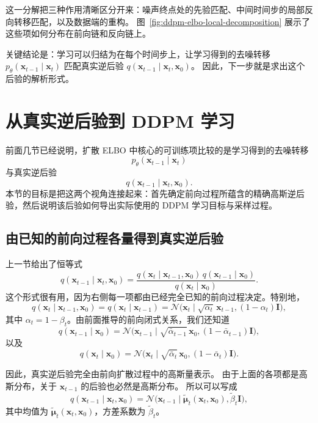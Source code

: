 这一分解把三种作用清晰区分开来：噪声终点处的先验匹配、中间时间步的局部反向转移匹配，以及数据端的重构。
图~\ref{fig:ddpm-elbo-local-decomposition} 展示了这些项如何分布在前向链和反向链上。



\noindent
关键结论是：学习可以归结为在每个时间步上，让学习得到的去噪转移
$p_\theta(\mathbf{x}_{t-1}\mid \mathbf{x}_t)$
匹配真实逆后验
$q(\mathbf{x}_{t-1}\mid \mathbf{x}_t,\mathbf{x}_0)$。
因此，下一步就是求出这个后验的解析形式。

\section{从真实逆后验到 DDPM 学习}

前面几节已经说明，扩散 ELBO 中核心的可训练项比较的是学习得到的去噪转移
\[
p_\theta(\mathbf{x}_{t-1}\mid \mathbf{x}_t)
\]
与真实逆后验
\[
q(\mathbf{x}_{t-1}\mid \mathbf{x}_t,\mathbf{x}_0).
\]
本节的目标是把这两个视角连接起来：首先确定前向过程所蕴含的精确高斯逆后验，然后说明该后验如何导出实际使用的 DDPM 学习目标与采样过程。

\subsection{由已知的前向过程各量得到真实逆后验}

上一节给出了恒等式
\[
q(\mathbf{x}_{t-1}\mid \mathbf{x}_t,\mathbf{x}_0)
=
\frac{
q(\mathbf{x}_t\mid \mathbf{x}_{t-1},\mathbf{x}_0)\,
q(\mathbf{x}_{t-1}\mid \mathbf{x}_0)
}{
q(\mathbf{x}_t\mid \mathbf{x}_0)
}.
\]
这个形式很有用，因为右侧每一项都由已经完全已知的前向过程决定。特别地，
\[
q(\mathbf{x}_t\mid \mathbf{x}_{t-1},\mathbf{x}_0)
=
q(\mathbf{x}_t\mid \mathbf{x}_{t-1})
=
\mathcal{N}\!\bigl(
\mathbf{x}_t \mid
\sqrt{\alpha_t}\,\mathbf{x}_{t-1},
(1-\alpha_t)\mathbf{I}
\bigr),
\]
其中 $\alpha_t=1-\beta_t$。由前面推导的前向闭式关系，我们还知道
\[
q(\mathbf{x}_{t-1}\mid \mathbf{x}_0)
=
\mathcal{N}\!\bigl(
\mathbf{x}_{t-1}\mid
\sqrt{\bar{\alpha}_{t-1}}\,\mathbf{x}_0,
(1-\bar{\alpha}_{t-1})\mathbf{I}
\bigr),
\]
以及
\[
q(\mathbf{x}_t\mid \mathbf{x}_0)
=
\mathcal{N}\!\bigl(
\mathbf{x}_t\mid
\sqrt{\bar{\alpha}_t}\,\mathbf{x}_0,
(1-\bar{\alpha}_t)\mathbf{I}
\bigr).
\]

因此，真实逆后验完全由前向扩散过程中的高斯量表示。
由于上面的各项都是高斯分布，关于 $\mathbf{x}_{t-1}$ 的后验也必然是高斯分布。
所以可以写成
\[
q(\mathbf{x}_{t-1}\mid \mathbf{x}_t,\mathbf{x}_0)
=
\mathcal{N}\!\bigl(
\mathbf{x}_{t-1}\mid
\tilde{\boldsymbol{\mu}}_t(\mathbf{x}_t,\mathbf{x}_0),
\tilde{\beta}_t\mathbf{I}
\bigr),
\]
其中均值为 $\tilde{\boldsymbol{\mu}}_t(\mathbf{x}_t,\mathbf{x}_0)$，方差系数为 $\tilde{\beta}_t$。


